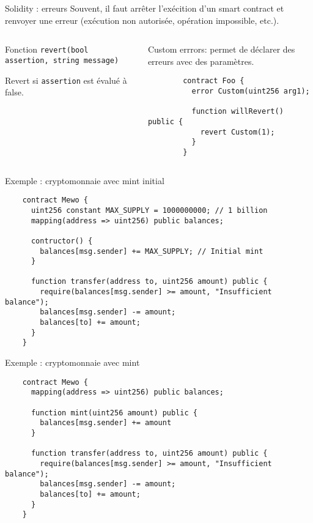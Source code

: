\begin{frame}[fragile]{Solidity : erreurs}
  Souvent, il faut arrêter l'exécition d'un smart contract et renvoyer une erreur (exécution non autorisée, opération impossible, etc.).

  \begin{columns}
    \begin{column}{0.47\textwidth}
      Fonction \texttt{revert(bool assertion, string message)}

      Revert si \texttt{assertion} est évalué à false.
    \end{column}
    \vspace{0.01\textwidth}
    \begin{column}{0.47\textwidth}
      Custom errrors: permet de déclarer des erreurs avec des paramètres.

      \begin{verbatim}
        contract Foo {
          error Custom(uint256 arg1);

          function willRevert() public {
            revert Custom(1);
          }
        }
      \end{verbatim}
    \end{column}
  \end{columns}
\end{frame}

\begin{frame}[fragile]{Exemple : cryptomonnaie avec mint initial}
  \begin{verbatim}
    contract Mewo {
      uint256 constant MAX_SUPPLY = 1000000000; // 1 billion
      mapping(address => uint256) public balances;

      contructor() {
        balances[msg.sender] += MAX_SUPPLY; // Initial mint
      }

      function transfer(address to, uint256 amount) public {
        require(balances[msg.sender] >= amount, "Insufficient balance");
        balances[msg.sender] -= amount;
        balances[to] += amount;
      }
    }
  \end{verbatim}
\end{frame}

\begin{frame}[fragile]{Exemple : cryptomonnaie avec mint}
  \begin{verbatim}
    contract Mewo {
      mapping(address => uint256) public balances;

      function mint(uint256 amount) public {
        balances[msg.sender] += amount
      }

      function transfer(address to, uint256 amount) public {
        require(balances[msg.sender] >= amount, "Insufficient balance");
        balances[msg.sender] -= amount;
        balances[to] += amount;
      }
    }
  \end{verbatim}
\end{frame}

